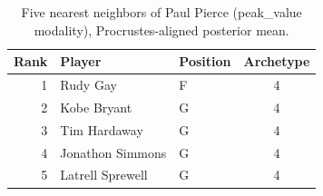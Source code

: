 \begin{table}[htbp]
  \centering\small
  \begin{tabular}{rllc}
    \toprule
    Rank & Player & Position & Archetype \\
    \midrule
    1 & Rudy Gay & F & 4 \\
    2 & Kobe Bryant & G & 4 \\
    3 & Tim Hardaway & G & 4 \\
    4 & Jonathon Simmons & G & 4 \\
    5 & Latrell Sprewell & G & 4 \\
    \bottomrule
  \end{tabular}
  \caption{Five nearest neighbors of Paul Pierce (peak_value modality), Procrustes-aligned posterior mean.}
  \label{tab:Paul_Pierce_neighbors_peak_value}
\end{table}

